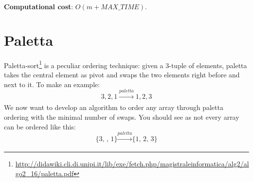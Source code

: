 \documentclass{article}
\begin{document}
\begin{framed}
  \noindent
  \textbf{Computational cost}: $O(m + MAX\_TIME)$.
\end{framed}

\section{Paletta}
Paletta-sort\footnote{\url{http://didawiki.cli.di.unipi.it/lib/exe/fetch.php/magistraleinformatica/alg2/algo2_16/paletta.pdf}} is a peculiar ordering technique: given a 3-tuple of elements, paletta takes the central element as pivot and swaps the two elements right before and next to it. To make an example:
\begin{equation}
  \textrm{\[3, 2, 1\]} \xrightarrow[]{paletta} \textrm{\[1, 2, 3\]}
\end{equation}
We now want to develop an algorithm to order any array through paletta ordering with the minimal number of swaps.
You should see as not every array can be ordered like this:
  \begin{equation}
  \textrm{\{3, , 1\}} \xrightarrow[]{paletta} \textrm{\{1, 2, 3\}}
  \end{equation}
\end{document}
